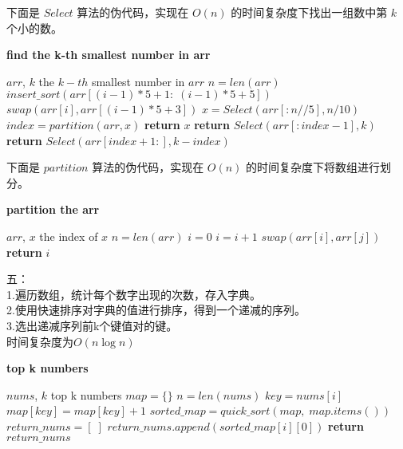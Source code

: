 \documentclass{article}
\begin{document}
\newpage
下面是 $Select$ 算法的伪代码，实现在 $O(n)$ 的时间复杂度下找出一组数中第 $k$ 个小的数。 
\begin{algorithm}
    \caption{\textbf{find the k-th smallest number in arr}}
    \label{alg:search_k-th_small}
    \begin{algorithmic}[1]
        \REQUIRE $arr$, $k$
        \ENSURE the $k-th$ smallest number in $arr$
        \STATE $n = len(arr)$
        \STATE $insert\_sort(arr[(i - 1)*5 + 1:\; (i - 1)*5 + 5])$
        \STATE $swap(arr[i], arr[(i -1)*5 + 3])$
        \ENDFOR
        \STATE $x = Select(arr[: n // 5], n / 10)$
        \STATE $index = partition(arr, x)$
        \STATE \textbf{return} $x$
        \STATE \textbf{return} $Select(arr[: index -1 ], k)$
        \ELSE 
        \STATE \textbf{return} $Select(arr[index + 1:], k - index)$      
        \ENDIF  
    \end{algorithmic}
\end{algorithm}

下面是 $partition$ 算法的伪代码，实现在 $O(n)$ 的时间复杂度下将数组进行划分。
\begin{algorithm}
    \caption{\textbf{partition the arr}}
    \label{alg:partition}
    \begin{algorithmic}[1]
        \REQUIRE $arr$, $x$
        \ENSURE the index of $x$
        \STATE $n = len(arr)$
        \STATE $i = 0$
        \STATE $i = i + 1$
        \STATE $swap(arr[i], arr[j])$
        \ENDIF
        \ENDFOR
        \STATE \textbf{return} $i$
    \end{algorithmic}
\end{algorithm}

\newpage
五：
\\
1.遍历数组，统计每个数字出现的次数，存入字典。
\\
2.使用快速排序对字典的值进行排序，得到一个递减的序列。
\\
3.选出递减序列前k个键值对的键。
\\
时间复杂度为$O(n \log n)$

\begin{algorithm}
    \caption{\textbf{top k numbers}}
    \label{alg:top_k}
    \begin{algorithmic}[1]
        \REQUIRE $nums$, $k$
        \ENSURE top k numbers
        \STATE $map = \{\}$
        \STATE $n = len(nums)$
        \STATE $key = nums[i]$
        \STATE $map[key] = map[key] + 1$
        \ENDFOR
        \STATE $sorted\_map = quick\_sort(map,\; map.items())$
        \STATE $return\_nums = [\;]$
        \STATE $return\_nums.append(sorted\_map[i][0])$
        \ENDIF
        \ENDFOR
        \STATE \textbf{return} $return\_nums$
    \end{algorithmic}
\end{algorithm}
\end{document}
